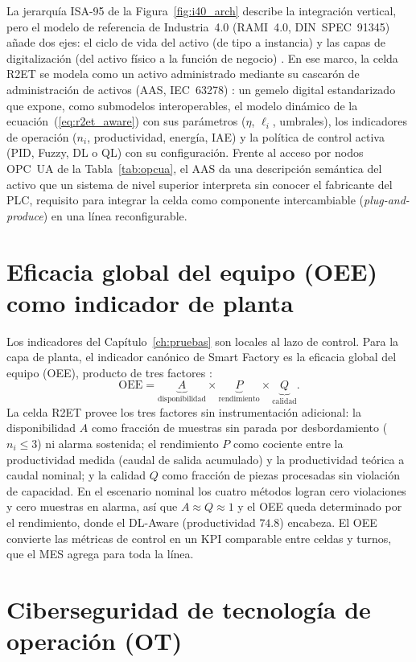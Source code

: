 La jerarquía ISA-95 de la Figura~\ref{fig:i40_arch} describe la integración vertical, pero el modelo de referencia de Industria~4.0 (RAMI~4.0, DIN~SPEC~91345) añade dos ejes: el ciclo de vida del activo (de tipo a instancia) y las capas de digitalización (del activo físico a la función de negocio) \cite{din2016rami40}. En ese marco, la celda R2ET se modela como un activo administrado mediante su cascarón de administración de activos (AAS, IEC~63278) \cite{iec63278aas}: un gemelo digital estandarizado que expone, como submodelos interoperables, el modelo dinámico de la ecuación~(\ref{eq:r2et_aware}) con sus parámetros ($\eta$, $\ell_i$, umbrales), los indicadores de operación ($n_i$, productividad, energía, IAE) y la política de control activa (PID, Fuzzy, DL o QL) con su configuración. Frente al acceso por nodos OPC~UA de la Tabla~\ref{tab:opcua}, el AAS da una descripción semántica del activo que un sistema de nivel superior interpreta sin conocer el fabricante del PLC, requisito para integrar la celda como componente intercambiable (\emph{plug-and-produce}) en una línea reconfigurable.

\section{Eficacia global del equipo (OEE) como indicador de planta}
\label{sec:oee}

Los indicadores del Capítulo~\ref{ch:pruebas} son locales al lazo de control. Para la capa de planta, el indicador canónico de Smart Factory es la eficacia global del equipo (OEE), producto de tres factores \cite{nakajima1988tpm}:
\[
\text{OEE} = \underbrace{A}_{\text{disponibilidad}} \times \underbrace{P}_{\text{rendimiento}} \times \underbrace{Q}_{\text{calidad}}.
\]
La celda R2ET provee los tres factores sin instrumentación adicional: la disponibilidad $A$ como fracción de muestras sin parada por desbordamiento ($n_i\le 3$) ni alarma sostenida; el rendimiento $P$ como cociente entre la productividad medida (caudal de salida acumulado) y la productividad teórica a caudal nominal; y la calidad $Q$ como fracción de piezas procesadas sin violación de capacidad. En el escenario nominal los cuatro métodos logran cero violaciones y cero muestras en alarma, así que $A\approx Q\approx 1$ y el OEE queda determinado por el rendimiento, donde el DL-Aware (productividad $74.8$) encabeza. El OEE convierte las métricas de control en un KPI comparable entre celdas y turnos, que el MES agrega para toda la línea.

\section{Ciberseguridad de tecnología de operación (OT)}

